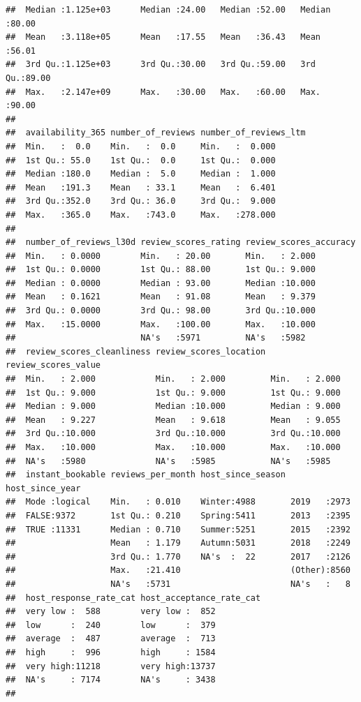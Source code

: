 \begin{verbatim}
##  Median :1.125e+03      Median :24.00   Median :52.00   Median :80.00  
##  Mean   :3.118e+05      Mean   :17.55   Mean   :36.43   Mean   :56.01  
##  3rd Qu.:1.125e+03      3rd Qu.:30.00   3rd Qu.:59.00   3rd Qu.:89.00  
##  Max.   :2.147e+09      Max.   :30.00   Max.   :60.00   Max.   :90.00  
##                                                                        
##  availability_365 number_of_reviews number_of_reviews_ltm
##  Min.   :  0.0    Min.   :  0.0     Min.   :  0.000      
##  1st Qu.: 55.0    1st Qu.:  0.0     1st Qu.:  0.000      
##  Median :180.0    Median :  5.0     Median :  1.000      
##  Mean   :191.3    Mean   : 33.1     Mean   :  6.401      
##  3rd Qu.:352.0    3rd Qu.: 36.0     3rd Qu.:  9.000      
##  Max.   :365.0    Max.   :743.0     Max.   :278.000      
##                                                          
##  number_of_reviews_l30d review_scores_rating review_scores_accuracy
##  Min.   : 0.0000        Min.   : 20.00       Min.   : 2.000        
##  1st Qu.: 0.0000        1st Qu.: 88.00       1st Qu.: 9.000        
##  Median : 0.0000        Median : 93.00       Median :10.000        
##  Mean   : 0.1621        Mean   : 91.08       Mean   : 9.379        
##  3rd Qu.: 0.0000        3rd Qu.: 98.00       3rd Qu.:10.000        
##  Max.   :15.0000        Max.   :100.00       Max.   :10.000        
##                         NA's   :5971         NA's   :5982          
##  review_scores_cleanliness review_scores_location review_scores_value
##  Min.   : 2.000            Min.   : 2.000         Min.   : 2.000     
##  1st Qu.: 9.000            1st Qu.: 9.000         1st Qu.: 9.000     
##  Median : 9.000            Median :10.000         Median : 9.000     
##  Mean   : 9.227            Mean   : 9.618         Mean   : 9.055     
##  3rd Qu.:10.000            3rd Qu.:10.000         3rd Qu.:10.000     
##  Max.   :10.000            Max.   :10.000         Max.   :10.000     
##  NA's   :5980              NA's   :5985           NA's   :5985       
##  instant_bookable reviews_per_month host_since_season host_since_year
##  Mode :logical    Min.   : 0.010    Winter:4988       2019   :2973   
##  FALSE:9372       1st Qu.: 0.210    Spring:5411       2013   :2395   
##  TRUE :11331      Median : 0.710    Summer:5251       2015   :2392   
##                   Mean   : 1.179    Autumn:5031       2018   :2249   
##                   3rd Qu.: 1.770    NA's  :  22       2017   :2126   
##                   Max.   :21.410                      (Other):8560   
##                   NA's   :5731                        NA's   :   8   
##  host_response_rate_cat host_acceptance_rate_cat
##  very low :  588        very low :  852         
##  low      :  240        low      :  379         
##  average  :  487        average  :  713         
##  high     :  996        high     : 1584         
##  very high:11218        very high:13737         
##  NA's     : 7174        NA's     : 3438         
## 
\end{verbatim}

